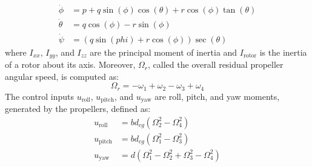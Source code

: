 \documentclass[conference]{IEEEtran}
\begin{document}
\begin{equation}
	\begin{split}
		\dot\phi &= p + q\sin(\phi)\cos(\theta) + r\cos(\phi)\tan(\theta)\\
		\dot \theta &= q\cos(\phi) - r\sin(\phi)\\
		\dot\psi &= (q\sin(phi) + r\cos(\phi))\sec(\theta) 
	\end{split}
\end{equation}
where $I_{xx}$, $I_{yy}$, and $I_{zz}$ are the principal moment of inertia and $I_{\text{rotor}}$ is the inertia of a rotor about its axis. Moreover, $\Omega_r$, called the overall residual propeller angular speed, is computed as:
\begin{equation}
	\Omega_r = -\omega_1 + \omega_2 - \omega_3 + \omega_4
\end{equation}
The control inputs $u_{\text{roll}}$, $u_{\text{pitch}}$, and $u_{\text{yaw}}$ are roll, pitch, and yaw moments, generated by the propellers, defined as:
\begin{equation}
	\begin{split}
		u_{\text{roll}} &= bd_{cg} (\Omega_2^2 - \Omega_4^2) \\
		u_{\text{pitch}} &= bd_{cg} (\Omega_1^2 - \Omega_3^2) \\
		u_{\text{yaw}} &= d (\Omega_1^2 - \Omega_2^2 + \Omega_3^2 - \Omega_4^2)
	\end{split}
\end{equation}
\end{document}
